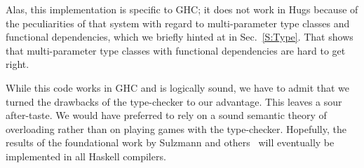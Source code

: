 \documentclass[nocopyrightspace,preprint]{sigplan-proc}
\begin{document}
Alas, this implementation is specific to GHC; it does not work in Hugs
because of the peculiarities of that system with regard to
multi-parameter type classes and functional dependencies, which we
briefly hinted at in Sec.~\ref{S:Type}. That shows that
multi-parameter type classes with functional dependencies are hard to
get right.

While this code works in GHC and is logically sound, we have to admit
that we turned the drawbacks of the type-checker to our
advantage. This leaves a sour after-taste. We would have preferred to
rely on a sound semantic theory of overloading rather than on playing
games with the type-checker. Hopefully, the results of the
foundational work by Sulzmann and others~\cite{SS02,NTGS02} will
eventually be implemented in all Haskell compilers.



\end{document}
